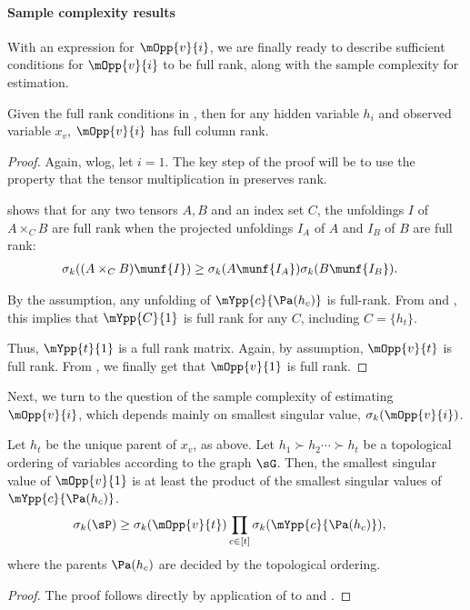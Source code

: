 \paragraph{Sample complexity results}

With an expression for $\mOpp{v}{i}$, we are finally ready to describe
sufficient conditions for $\mOpp{v}{i}$ to be full rank, along with the
sample complexity for estimation.

\begin{lemma}
  \label{lem:full-rank-suff}
  Given the full rank conditions in , then
  for any hidden variable $h_i$ and observed variable $x_v$,
  $\mOpp{v}{i}$ has full column rank.
\end{lemma}
\begin{proof}
Again, wlog, let $i=1$. 
The key step of the proof will be to use the property that the tensor
  multiplication in  preserves rank.

 shows that for any two tensors $A,
  B$ and an index set $C$, the unfoldings $I$ of $A \times_C B$ are full
  rank when the projected unfoldings $I_A$ of $A$ and $I_B$ of $B$ are
  full rank:
\begin{align*}
  \sigma_{k}( (A \times_C B)\munf{I} )
    &\ge \sigma_{k}(A\munf{I_A}) \sigma_{k}(B\munf{I_B}).
\end{align*}

By the assumption, any unfolding of $\mYpp{c}{\Pa(h_c)}$ is full-rank. 
From  and
  , this implies that $\mYpp{C}{1}$ is
  full rank for any $C$, including $C = \{h_t\}$.

Thus, $\mYpp{t}{1}$ is a full rank matrix. 
Again, by assumption,
  $\mOpp{v}{t}$ is full rank. From , we finally
  get that $\mOpp{v}{1}$ is full rank.
\end{proof}

Next, we turn to the question of the sample complexity of estimating
$\mOpp{v}{i}$, which depends mainly on smallest singular value,
$\sigma_{k}(\mOpp{v}{i})$. 

\begin{lemma}
  \label{lem:mopp-singular-values}

Let $h_t$ be the unique parent of $x_v$, as above.
Let $h_1 \succ h_2 \cdots \succ h_t$ be a topological ordering of
  variables according to the graph $\sG$.
  Then, the smallest singular value of $\mOpp{v}{1}$ is at least the product of the smallest singular values of $\mYpp{c}{\Pa(h_c)}$.
\begin{align*}
  \sigma_{k}(\sP) &\ge \sigma_{k}(\mOpp{v}{t}) 
        \prod_{c \in [t]} \sigma_{k}(\mYpp{c}{\Pa(h_c)}),
\end{align*}
where the parents $\Pa(h_c)$ are decided by the topological ordering. 
\end{lemma}
\begin{proof}
  The proof follows directly by application of
   to  and
  .
\end{proof}

